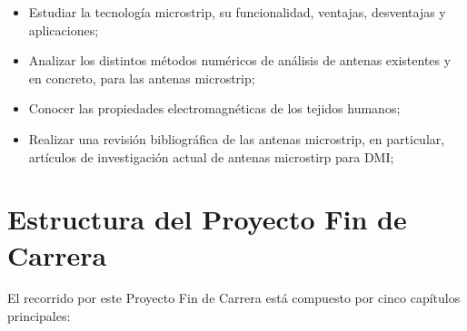 \begin{itemize}
    \item Estudiar la tecnología microstrip, su funcionalidad, ventajas, desventajas y aplicaciones;
    \item Analizar los distintos métodos numéricos de análisis de antenas existentes y en concreto, para las antenas microstrip;
    \item Conocer las propiedades electromagnéticas de los tejidos humanos;
    \item Realizar una revisión bibliográfica de las antenas microstrip, en particular, artículos de investigación actual de antenas microstirp para DMI;
\end{itemize}


\section{Estructura del Proyecto Fin de Carrera}\label{sec:contenidos}

El recorrido por este Proyecto Fin de Carrera está compuesto por cinco capítulos principales:

